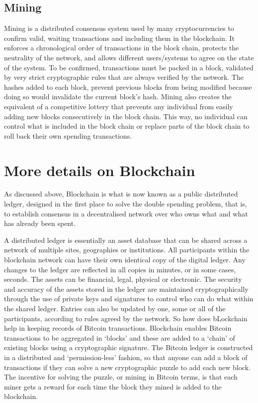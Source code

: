 \subsection{Mining}
Mining is a distributed consensus system used by many cryptocurrencies to confirm valid, waiting transactions and including them in the blockchain. It enforces a chronological order of transactions in the block chain, protects the neutrality of the network, and allows different users/systems to agree on the state of the system. To be confirmed, transactions must be packed in a block, validated by very strict cryptographic rules that are always verified by the network. The hashes added to each block, prevent previous blocks from being modified because doing so would invalidate the current block's hash. Mining also creates the equivalent of a competitive lottery that prevents any individual from easily adding new blocks consecutively in the block chain. This way, no individual can control what is included in the block chain or replace parts of the block chain to roll back their own spending transactions.

\section{More details on Blockchain}
As discussed above, Blockchain is what is now known as a public distributed ledger, designed in the first place to solve the double spending problem, that is, to establish consensus in a decentralised network over who owns what and what has already been spent\cite{Nakamoto2008Bitcoin:System}. 

A distributed ledger is essentially an asset database that can be shared across a network of multiple sites, geographies or institutions. All participants within the blockchain network can have their own identical copy of the digital ledger. Any changes to the ledger are reflected in all copies in minutes, or in some cases, seconds. The assets can be financial, legal, physical or electronic. The security and accuracy of the assets stored in the ledger are maintained cryptographically through the use of private keys and signatures to control who can do what within the shared ledger. Entries can also be updated by one, some or all of the participants, according to rules agreed by the network.\cite{Walport2015DistributedChain}
So how does bLockchain help in keeping records of Bitcoin transactions.  Blockchain enables Bitcoin transactions to be aggregated in ‘blocks’ and these are added to a ‘chain’ of existing blocks using a cryptographic signature. The Bitcoin ledger is constructed in a distributed and ‘permission-less’ fashion, so that anyone can add a block of transactions if they can solve a new cryptographic puzzle to add each new block. The incentive for solving the puzzle, or mining in Bitcoin terms, is that each miner gets a reward for each time the block they mined is added to the blockchain.\cite{Nakamoto2008Bitcoin:System}

